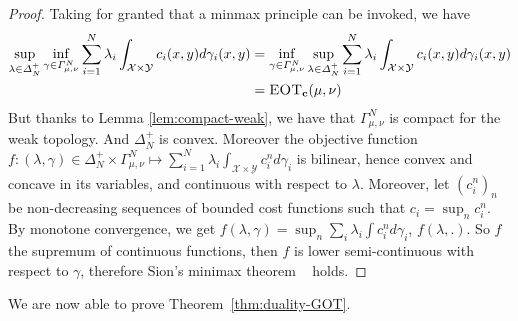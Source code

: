 \begin{proof}
Taking for granted that a minmax principle can be invoked, we have
\begin{align*}
    \sup_{\lambda\in\Delta_N^{+}}\inf_{\gamma\in\Gamma_{\mu,\nu}^N} \sum_{i=1}^N\lambda_i\int_{\mathcal{X}\times\mathcal{Y}}c_i(x,y)d\gamma_i(x,y) &= \inf_{\gamma\in\Gamma_{\mu,\nu}^N}\sup_{\lambda\in \Delta_N^{+}} \sum_{i=1}^N\lambda_i\int_{\mathcal{X}\times\mathcal{Y}}c_i(x,y)d\gamma_i(x,y)\\
    &=\textsc{EOT}_{\mathbf{c}}(\mu,\nu)
\end{align*}
But thanks to Lemma \ref{lem:compact-weak}, we have that $\Gamma_{\mu,\nu}^N$ is compact for the weak topology. And $\Delta^+_N$ is convex. Moreover the objective function $f:(\lambda,\gamma)\in\Delta^+_N\times\Gamma^N_{\mu,\nu} \mapsto \sum_{i=1}^N\lambda_i \int_{\mathcal{X}\times \mathcal{Y}} c^n_id\gamma_i$ is bilinear, hence convex and concave  in its variables, and continuous with respect to $\lambda$. Moreover, let $(c^n_i)_n$ be non-decreasing sequences of bounded cost functions such that $c_i=\sup_n c^n_i$. By monotone convergence, we get $f(\lambda,\gamma) = \sup_n \sum_i\lambda_i \int c^n_i d\gamma_i$, $f(\lambda,.)$. So $f$ the supremum of continuous functions, then $f$ is lower semi-continuous with respect to $\gamma$, therefore Sion's minimax theorem
~\citep{sion1958general} holds.

\end{proof}

We are now able to prove Theorem~\ref{thm:duality-GOT}.

